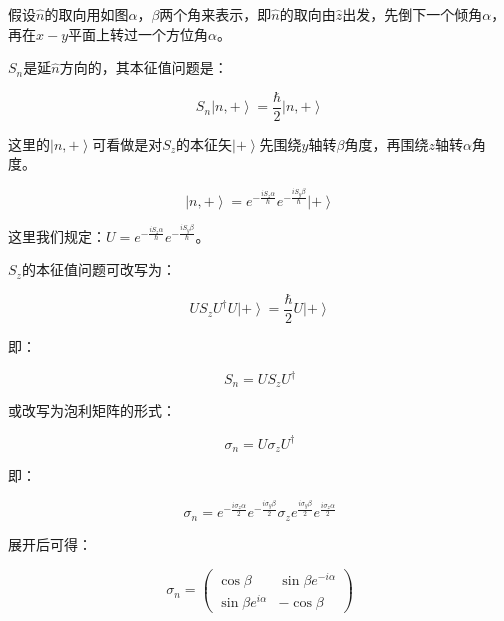 假设$\hat n$的取向用如图$\alpha$，$\beta$两个角来表示，即$\hat n$的取向由$\hat z$出发，先倒下一个倾角$\alpha$，再在$x-y$平面上转过一个方位角$\alpha$。

$S_n$是延$\hat n$方向的，其本征值问题是：

\begin{equation}
S_n \left| n,+ \right\rangle = \frac{\hbar }{2} \left| n,+ \right\rangle
\end{equation}

这里的$\left| n,+ \right\rangle$可看做是对$S_z$的本征矢$\left| + \right\rangle$先围绕$y$轴转$\beta$角度，再围绕$z$轴转$\alpha$角度。

\begin{equation}
\left| n,+ \right\rangle = e^{- \frac{ i S_z \alpha }{ \hbar }}  e^{- \frac{ i S_y \beta }{ \hbar }}  \left| + \right\rangle
\end{equation}

这里我们规定：$U = e^{- \frac{ i S_z \alpha }{ \hbar }}  e^{- \frac{ i S_y \beta }{ \hbar }}$。

$S_z$的本征值问题可改写为：

\begin{equation}
U S_z U^\dagger U \left| + \right\rangle = \frac{\hbar}{2} U \left| + \right\rangle
\end{equation}

即：

\begin{equation}
S_n = U S_z U^\dagger
\end{equation}

或改写为泡利矩阵的形式：

\begin{equation}
\sigma_n = U \sigma_z U^\dagger
\end{equation}

即：

\begin{equation}
\sigma_n = e^{- \frac{ i \sigma_z \alpha }{2}} e^{- \frac{ i \sigma_y \beta }{2}} \sigma_z e^{ \frac{ i \sigma_y \beta }{2}}  e^{ \frac{ i \sigma_z \alpha }{2}}
\end{equation}

展开后可得：

\begin{equation}
\sigma_n = \left( \begin{array}{cc}  \cos \beta & \sin \beta e^{- i \alpha}  \\  \sin \beta e^{i \alpha} & - \cos \beta  \end{array}  \right)
\end{equation}

